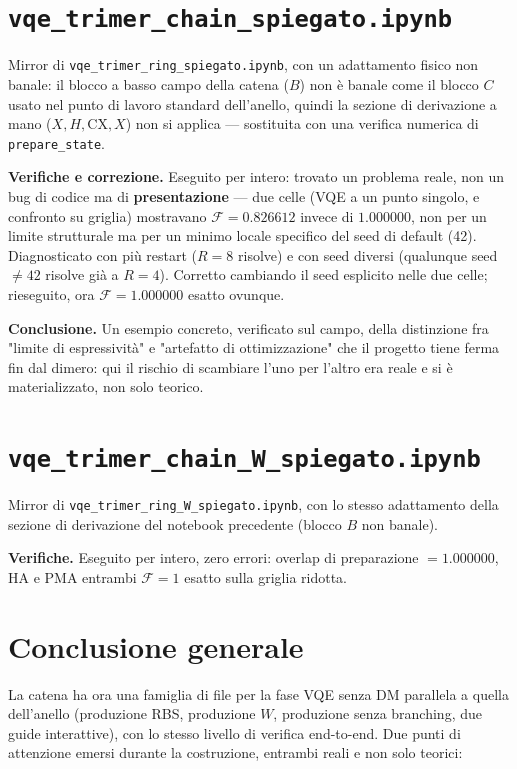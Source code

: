 \documentclass[11pt,a4paper]{article}
\begin{document}
\section*{\texttt{vqe\_trimer\_chain\_spiegato.ipynb}}

Mirror di \texttt{vqe\_trimer\_ring\_spiegato.ipynb}, con un adattamento fisico non
banale: il blocco a basso campo della catena ($B$) non è banale come il blocco $C$
usato nel punto di lavoro standard dell'anello, quindi la sezione di derivazione a
mano ($X,H,\mathrm{CX},X$) non si applica — sostituita con una verifica numerica di
\texttt{prepare\_state}.

\textbf{Verifiche e correzione.} Eseguito per intero: trovato un problema reale, non
un bug di codice ma di \textbf{presentazione} — due celle (VQE a un punto singolo, e
confronto su griglia) mostravano $\mathcal F=0.826612$ invece di $1.000000$, non per un
limite strutturale ma per un minimo locale specifico del seed di default (42).
Diagnosticato con più restart ($R=8$ risolve) e con seed diversi (qualunque seed
$\neq42$ risolve già a $R=4$). Corretto cambiando il seed esplicito nelle due celle;
rieseguito, ora $\mathcal F=1.000000$ esatto ovunque.

\textbf{Conclusione.} Un esempio concreto, verificato sul campo, della distinzione fra
"limite di espressività" e "artefatto di ottimizzazione" che il progetto tiene ferma
fin dal dimero: qui il rischio di scambiare l'uno per l'altro era reale e si è
materializzato, non solo teorico.

\section*{\texttt{vqe\_trimer\_chain\_W\_spiegato.ipynb}}

Mirror di \texttt{vqe\_trimer\_ring\_W\_spiegato.ipynb}, con lo stesso adattamento
della sezione di derivazione del notebook precedente (blocco $B$ non banale).

\textbf{Verifiche.} Eseguito per intero, zero errori: overlap di preparazione
$=1.000000$, HA e PMA entrambi $\mathcal F=1$ esatto sulla griglia ridotta.

\section*{Conclusione generale}

La catena ha ora una famiglia di file per la fase VQE senza DM parallela a quella
dell'anello (produzione RBS, produzione $W$, produzione senza branching, due guide
interattive), con lo stesso livello di verifica end-to-end. Due punti di attenzione
emersi durante la costruzione, entrambi reali e non solo teorici:
\end{document}
